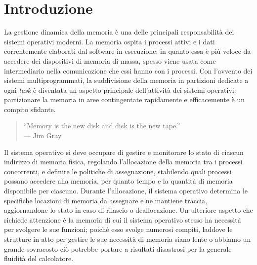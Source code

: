 \chapter{Introduzione}

La gestione dinamica della memoria è una delle principali responsabilità dei sistemi operativi moderni\footnotemark. La memoria ospita i processi attivi e i dati correntemente elaborati dal software in esecuzione; in quanto essa è più veloce da accedere dei dispositivi di memoria di massa, spesso viene usata come intermediario nella comunicazione che essi hanno con i processi. Con l'avvento dei sistemi multiprogrammati, la suddivisione della memoria in partizioni dedicate a ogni \textit{task} è diventata un aspetto principale dell'attività dei sistemi operativi: partizionare la memoria in aree contingentate rapidamente e efficacemente è un compito sfidante. 

\begin{quote}
“Memory is the new disk and disk is the new tape.”\\
\hfill --- Jim Gray
\end{quote}


Il sistema operativo si deve occupare di gestire e monitorare lo stato di ciascun indirizzo di memoria fisica, regolando l'allocazione della memoria tra i processi concorrenti, e definire le politiche di assegnazione, stabilendo quali processi possano accedere alla memoria, per quanto tempo e la quantità di memoria disponibile per ciascuno. Durante l'allocazione, il sistema operativo determina le specifiche locazioni di memoria da assegnare e ne mantiene traccia, aggiornandone lo stato in caso di rilascio o deallocazione. Un ulteriore aspetto che richiede attenzione è la memoria di cui il sistema operativo stesso ha necessità per svolgere le sue funzioni; poiché esso svolge numerosi compiti, laddove le strutture in atto per gestire le sue necessità di memoria siano lente o abbiamo un grande sovracosto ciò potrebbe portare a risultati disastrosi per la generale fluidità del calcolatore.

